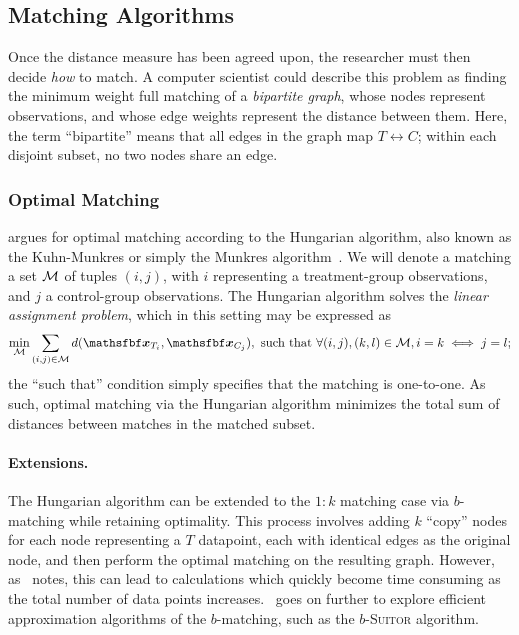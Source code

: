 \documentclass[11pt]{extarticle}
\begin{document}
\subsection{Matching Algorithms}

Once the distance measure has been agreed upon, the researcher must then decide \emph{how} to match. A computer scientist could describe this problem as finding the minimum weight full matching of a \emph{bipartite graph}, whose nodes represent observations, and whose edge weights represent the distance between them. Here, the term ``bipartite'' means that all edges in the graph map $T \leftrightarrow C$; within each disjoint subset, no two nodes share an edge.


\subsubsection{Optimal Matching}

\textcite{rosenbaum_optimal_1989} argues for optimal matching according to the Hungarian algorithm, also known as the Kuhn-Munkres or simply the Munkres algorithm~\parencite{munkres_algorithms_1957}. We will denote a matching a set $\mathcal{M}$ of tuples $(i, j)$, with $i$ representing a treatment-group observations, and $j$ a control-group observations. The Hungarian algorithm solves the \emph{linear assignment problem}, which in this setting may be expressed as
\begin{equation}
  \min_{\set{M}} \sum_{(i, j) \in \set{M}} d(\vec{x}_{T_{i}}, \vec{x}_{C_{j}}), \text{ such that } \forall (i, j), (k, l) \in \set{M}, i = k \iff j = l;
\end{equation}
the ``such that'' condition simply specifies that the matching is one-to-one. As such, optimal matching via the Hungarian algorithm minimizes the total sum of distances between matches in the matched subset.

\paragraph{Extensions.} The Hungarian algorithm can be extended to the $1:k$ matching case via $b$-matching while retaining optimality.
This process involves adding $k$ ``copy'' nodes for each node representing a $T$ datapoint, each with identical edges as the original node, and then perform the optimal matching on the resulting graph.
However, as~\textcite{khan_efficient_2016} notes, this can lead to calculations which quickly become time consuming as the total number of data points increases.~\textcite{khan_efficient_2016} goes on further to explore efficient approximation algorithms of the $b$-matching, such as the $b$-\textsc{Suitor} algorithm.
\end{document}
